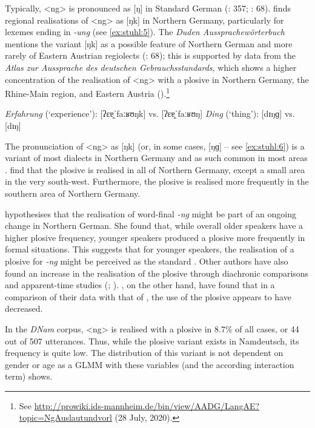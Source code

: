 \documentclass[output=paper]{langsci/langscibook}
\begin{document}
Typically, <ng> is pronounced as [ŋ] in Standard German (\citealt{elmentaler_norddeutscher_2015}: 357; \citealt{kleiner_duden_2015}: 68). \citet[233]{konig_atlas_2019b} finds regional realisations of <ng> as [ŋk] in Northern Germany, particularly for lexemes ending in \textit{-ung} (see \ref{ex:stuhl:5}). The \textit{Duden Aussprachewörterbuch} mentions the variant [ŋk] as a possible feature of Northern German and more rarely of Eastern Austrian regiolects (\citealt{kleiner_duden_2015}: 68); this is supported by data from the \textit{Atlas zur Aussprache des deutschen Gebrauchsstandards}, which shows a higher concentration of the realisation of <ng> with a plosive in Northern Germany, the Rhine-Main region, and Eastern Austria (\citealt{kleiner_atlas_2011}).\footnote{See \url{http://prowiki.ids-mannheim.de/bin/view/AADG/LangAE?topic=NgAuslautundvorl} (28 July, 2020).}

 
\ea\label{ex:stuhl:5}  
\textit{Erfahrung} (‘experience’): {[ʔɛɐ̯ˈfaːʁʊŋk]} vs. {[ʔɛɐ̯ˈfaːʁʊŋ]}
 \ex\label{ex:stuhl:6}    
\textit{Ding} (‘thing’): {[dɪŋɡ]} vs. {[dɪŋ]}
 \z
 

The pronunciation of <ng> as [ŋk] (or, in some cases, [ŋɡ] -- see \ref{ex:stuhl:6}) is a variant of most dialects in Northern Germany and as such common in most areas \citep[361]{elmentaler_norddeutscher_2015}. \citet[359]{elmentaler_norddeutscher_2015} find that the plosive is realised in all of Northern Germany, except a small area in the very south-west. Furthermore, the plosive is realised more frequently in the southern area of Northern Germany.

\citet[83]{becker_ruhrdeutsch_2003} hypothesises that the realisation of word-final \textit{-ng} might be part of an ongoing change in Northern German. She found that, while overall older speakers have a higher plosive frequency, younger speakers produced a plosive more frequently in formal situations. This suggests that for younger speakers, the realisation of a plosive for \textit{-ng} might be perceived as the standard \citep[83]{becker_ruhrdeutsch_2003}. Other authors have also found an increase in the realisation of the plosive through diachronic comparisons and apparent-time studies (\citealt{stellmacher_studien_1977}; \citealt{lameli_standard_2004}). \citet[362]{elmentaler_norddeutscher_2015}, on the other hand, have found that in a comparison of their data with that of \citet{pfeffer_grunddeutsch_1975}, the use of the plosive appears to have decreased.

In the \textit{DNam} corpus, <ng> is realised with a plosive in 8.7\% of all cases, or 44 out of 507 utterances. Thus, while the plosive variant exists in Namdeutsch, its frequency is quite low. The distribution of this variant is not dependent on gender or age as a GLMM with these variables (and the according interaction term) shows. 
\end{document}
